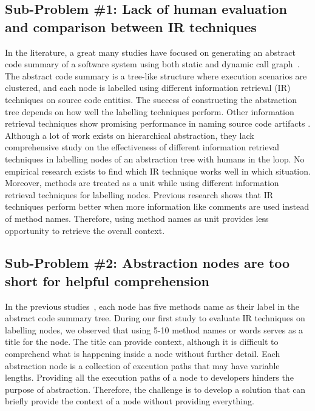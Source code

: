     \subsection{Sub-Problem \#1: Lack of human evaluation and comparison between IR techniques} In the literature, a great many studies have focused on generating an abstract code summary of a software system using both static and dynamic call graph~\cite{feng2018hierarchicalExecutionComprehension, gharibi2018automaticStaticCluster, xin2019identifyingFeaturesExecution}. The abstract code summary is a tree-like structure where execution scenarios are clustered, and each node is labelled using different information retrieval (IR) techniques on source code entities. The success of constructing the abstraction tree depends on how well the labelling techniques perform. Other information retrieval techniques show promising performance in naming source code artifacts \cite{chen2016topicMiningRepositories, panichella2013topicModelsTasks, sun2016surveyTopicSE}. Although a lot of work exists on hierarchical abstraction, they lack comprehensive study on the effectiveness of different information retrieval techniques in labelling nodes of an abstraction tree with humans in the loop. No empirical research exists to find which IR technique works well in which situation.
Moreover, methods are treated as a unit \cite{gharibi2018automaticStaticCluster, feng2018hierarchicalExecutionComprehension} while using different information retrieval techniques for labelling nodes. Previous research \cite{de2012IRMethodsArtifacts} shows that IR techniques perform better when more information like comments are used instead of method names. Therefore, using method names as unit provides less opportunity to retrieve the overall context.
    

    \subsection{Sub-Problem \#2: Abstraction nodes are too short for helpful comprehension}
    In the previous studies~\cite{feng2018hierarchicalExecutionComprehension, gharibi2018automaticStaticCluster}, each node has five methods name as their label in the abstract code summary tree. During our first study to evaluate IR techniques on labelling nodes, we observed that using 5-10 method names or words serves as a title for the node. The title can provide context, although it is difficult to comprehend what is happening inside a node without further detail. Each abstraction node is a collection of execution paths that may have variable lengths. Providing all the execution paths of a node to developers hinders the purpose of abstraction. Therefore, the challenge is to develop a solution that can briefly provide the context of a node without providing everything. 
    
